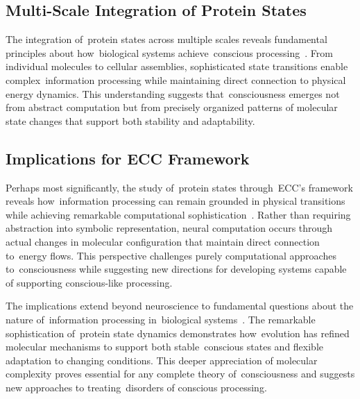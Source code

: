 \subsection*{Multi-Scale Integration of Protein States~}

The integration of~protein states across multiple scales reveals fundamental principles about how~biological systems achieve~conscious processing~\cite{Hameroff2014, breakspear2005dynamics}. From individual molecules to cellular assemblies, sophisticated state transitions enable complex~information processing while maintaining direct connection to physical energy dynamics. This understanding suggests that~consciousness emerges not from abstract computation but from precisely organized patterns of molecular state changes that support both stability and adaptability.

\subsection*{Implications for ECC Framework~}

Perhaps most significantly, the study of~protein states through~ECC's framework reveals how~information processing can remain grounded in physical transitions while achieving remarkable computational sophistication~\cite{Hameroff2014, butlin2023consciousnessartificialintelligenceinsights}. Rather than requiring abstraction into symbolic representation, neural computation occurs through actual changes in molecular configuration that maintain direct connection to~energy flows. This perspective challenges purely computational approaches to~consciousness while suggesting new directions for developing systems capable of supporting conscious-like processing.

The implications extend beyond neuroscience to fundamental questions about the nature of~information processing in~biological systems~\cite{Frauenfelder2009, hunt2024electromagnetic}. The remarkable sophistication of~protein state dynamics demonstrates how~evolution has refined molecular mechanisms to support both stable~conscious states and flexible adaptation to changing conditions. This deeper appreciation of molecular complexity proves essential for any complete theory of~consciousness and suggests new approaches to treating~disorders of conscious processing.

